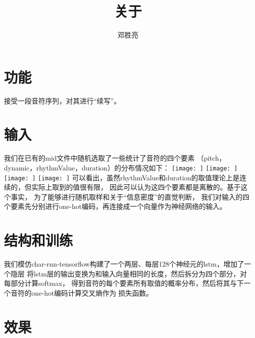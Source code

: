 \documentclass[UTF8]{article}
\title{关于}
\author{邓胜亮}
\begin{document}
  \maketitle
  \section{功能}
    接受一段音符序列，对其进行“续写”。
  \section{输入}
    我们在已有的mid文件中随机选取了一些统计了音符的四个要素
    （pitch，dynamic，rhythmValue，duration）的分布情况如下：
      \texttt{[image: ]}
      \texttt{[image: ]}
      \texttt{[image: ]}
      \texttt{[image: ]}
    可以看出，虽然rhythmValue和duration的取值理论上是连续的，但实际上取到的值很有限，
    因此可以认为这四个要素都是离散的。基于这个事实，
    为了能够进行随机取样和关于“信息密度”的直觉判断，
    我们对输入的四个要素先分别进行one-hot编码，再连接成一个向量作为神经网络的输入。

  \section{结构和训练}
    我们模仿char-rnn-tensorflow构建了一个两层、每层128个神经元的lstm，增加了一个隐层
    将lstm层的输出变换为和输入向量相同的长度，然后拆分为四个部分，对每部分计算softmax，
    得到音符的每个要素所有取值的概率分布，然后将其与下一个音符的one-hot编码计算交叉熵作为
    损失函数。
  \section{效果}
\end{document}
